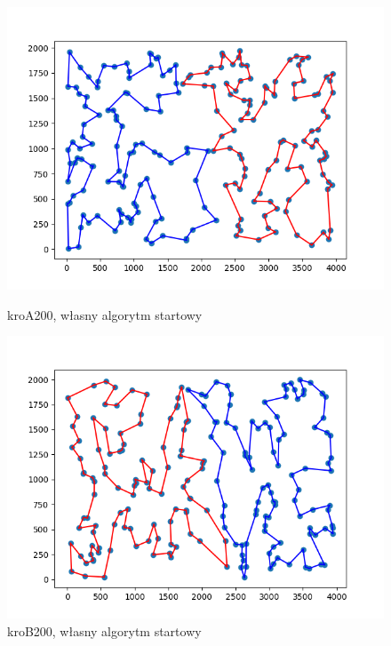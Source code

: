 \documentclass[11pt]{article}
\begin{document}
\begin{figure}[H]
    \vspace{0.5cm}

    \begin{minipage}[t]{0.45\textwidth}
        \centering
        \includegraphics[width=\linewidth]{best_paths/kroA200/traverse_steepest_shuffle/split_paths_regret_TSP.png}
        \caption{kroA200, własny algorytm startowy}
    \end{minipage}
    \hfill
    \begin{minipage}[t]{0.45\textwidth}
        \centering
        \includegraphics[width=\linewidth]{best_paths/kroB200/traverse_steepest_shuffle/split_paths_regret_TSP.png}
        \caption{kroB200, własny algorytm startowy}
    \end{minipage}
    \label{fig:minipage-steepest-vertex}
\end{figure}
\end{document}
